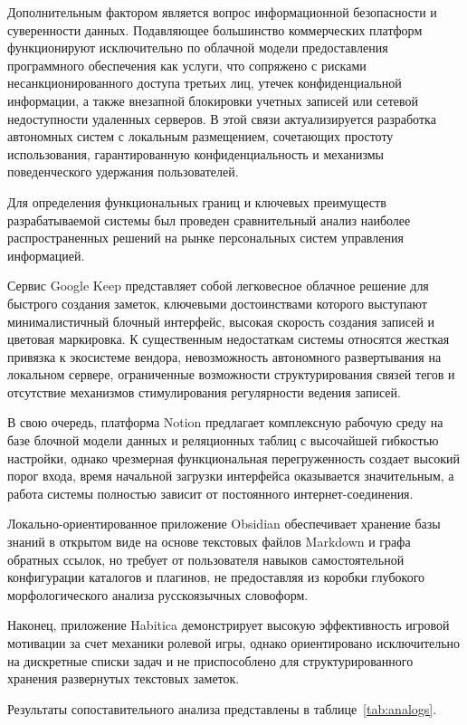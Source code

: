 \documentclass[a4paper,14pt]{extreport}
\begin{document}
Дополнительным фактором является вопрос информационной безопасности и суверенности данных. Подавляющее большинство коммерческих платформ функционируют исключительно по облачной модели предоставления программного обеспечения как услуги, что сопряжено с рисками несанкционированного доступа третьих лиц, утечек конфиденциальной информации, а также внезапной блокировки учетных записей или сетевой недоступности удаленных серверов. В этой связи актуализируется разработка автономных систем с локальным размещением, сочетающих простоту использования, гарантированную конфиденциальность и механизмы поведенческого удержания пользователей.

Для определения функциональных границ и ключевых преимуществ разрабатываемой системы был проведен сравнительный анализ наиболее распространенных решений на рынке персональных систем управления информацией.

Сервис Google Keep представляет собой легковесное облачное решение для быстрого создания заметок, ключевыми достоинствами которого выступают минималистичный блочный интерфейс, высокая скорость создания записей и цветовая маркировка. К существенным недостаткам системы относятся жесткая привязка к экосистеме вендора, невозможность автономного развертывания на локальном сервере, ограниченные возможности структурирования связей тегов и отсутствие механизмов стимулирования регулярности ведения записей.

В свою очередь, платформа Notion предлагает комплексную рабочую среду на базе блочной модели данных и реляционных таблиц с высочайшей гибкостью настройки, однако чрезмерная функциональная перегруженность создает высокий порог входа, время начальной загрузки интерфейса оказывается значительным, а работа системы полностью зависит от постоянного интернет-соединения.

Локально-ориентированное приложение Obsidian обеспечивает хранение базы знаний в открытом виде на основе текстовых файлов Markdown и графа обратных ссылок, но требует от пользователя навыков самостоятельной конфигурации каталогов и плагинов, не предоставляя из коробки глубокого морфологического анализа русскоязычных словоформ.

Наконец, приложение Habitica демонстрирует высокую эффективность игровой мотивации за счет механики ролевой игры, однако ориентировано исключительно на дискретные списки задач и не приспособлено для структурированного хранения развернутых текстовых заметок.

Результаты сопоставительного анализа представлены в таблице~\ref{tab:analogs}.
\end{document}
